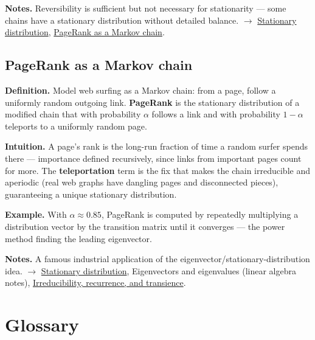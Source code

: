 \documentclass[11pt,a4paper]{article}
\begin{document}
\textbf{Notes.} Reversibility is sufficient but not necessary for stationarity --- some chains have a stationary distribution without detailed balance. $\to$ \hyperref[sec:stationary-distribution]{Stationary distribution}, \hyperref[sec:pagerank-as-a-markov-chain]{PageRank as a Markov chain}.

\subsection{PageRank as a Markov chain}\label{sec:pagerank-as-a-markov-chain}

\textbf{Definition.} Model web surfing as a Markov chain: from a page, follow a uniformly random outgoing link. \textbf{PageRank} is the stationary distribution of a modified chain that with probability $\alpha$ follows a link and with probability $1 - \alpha$ teleports to a uniformly random page.

\textbf{Intuition.} A page's rank is the long-run fraction of time a random surfer spends there --- importance defined recursively, since links from important pages count for more. The \textbf{teleportation} term is the fix that makes the chain irreducible and aperiodic (real web graphs have dangling pages and disconnected pieces), guaranteeing a unique stationary distribution.

\textbf{Example.} With $\alpha  \approx  0.85$, PageRank is computed by repeatedly multiplying a distribution vector by the transition matrix until it converges --- the power method finding the leading eigenvector.

\textbf{Notes.} A famous industrial application of the eigenvector/stationary-distribution idea. $\to$ \hyperref[sec:stationary-distribution]{Stationary distribution}, Eigenvectors and eigenvalues (linear algebra notes), \hyperref[sec:irreducibility-recurrence-and-transience]{Irreducibility, recurrence, and transience}.


\section{Glossary}
\end{document}
